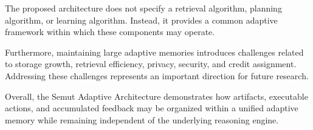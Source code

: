 The proposed architecture does not specify a retrieval algorithm, planning algorithm, or learning algorithm. Instead, it provides a common adaptive framework within which these components may operate.

Furthermore, maintaining large adaptive memories introduces challenges related to storage growth, retrieval efficiency, privacy, security, and credit assignment. Addressing these challenges represents an important direction for future research.

Overall, the Semut Adaptive Architecture demonstrates how artifacts, executable actions, and accumulated feedback may be organized within a unified adaptive memory while remaining independent of the underlying reasoning engine.
